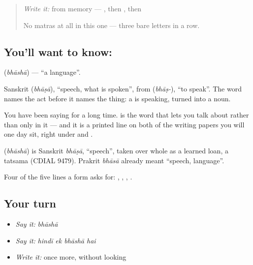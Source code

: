 \label{lesson:HI-C68-language}



\begin{quote}
\emph{Write it:} \textbf{} from memory — , then , then 

No matras at all in this one — three bare letters in a row.
\end{quote}

\subsection*{You'll want to know: }
\textbf{} (\emph{bhāshā}) — \textquotedblleft{}a language\textquotedblright{}.

Sanskrit  (\emph{bhāṣā}), \textquotedblleft{}speech, what is spoken\textquotedblright{}, from  (\emph{bhāṣ-}), \textquotedblleft{}to speak\textquotedblright{}. The word names the act before it names the thing: a  is speaking, turned into a noun.

You have been saying \textbf{   } for a long time.  is the word that lets you talk about  rather than only in it — and it is a printed line on both of the writing papers you will one day sit, right under  and .

\begin{cousinweb}
\textbf{} (\emph{bhāshā}) is Sanskrit \emph{bhāṣā}, \textquotedblleft{}speech\textquotedblright{}, taken over whole as a learned loan, a tatsama (CDIAL 9479). Prakrit \emph{bhāsā} already meant \textquotedblleft{}speech, language\textquotedblright{}.
\end{cousinweb}

\begin{grammarlens}[title={What you've built}]
Four of the five lines a form asks for: , , , .
\end{grammarlens}

\subsection*{Your turn}
\begin{itemize}
\raggedright
  \item \emph{Say it:} \emph{bhāshā}
  \item \emph{Say it:} \emph{hindī ek bhāshā hai}
  \item \emph{Write it:}  once more, without looking
\end{itemize}

